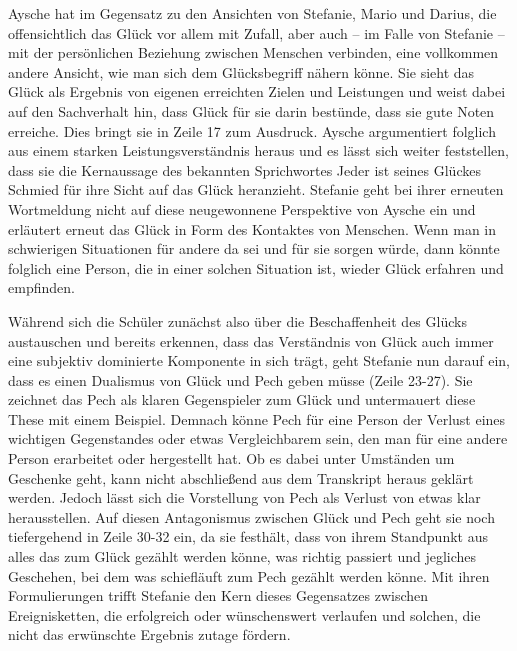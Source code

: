 Aysche hat im Gegensatz zu den Ansichten von Stefanie, Mario und Darius, die offensichtlich das Glück vor allem mit Zufall, aber auch -- im Falle von Stefanie -- mit der persönlichen Beziehung zwischen Menschen verbinden, eine vollkommen andere Ansicht, wie man sich dem Glücksbegriff nähern könne. 
Sie sieht das Glück als Ergebnis von eigenen erreichten Zielen und Leistungen und weist dabei auf den Sachverhalt hin, dass Glück für sie darin bestünde, dass sie gute Noten erreiche.
Dies bringt sie in Zeile 17 zum Ausdruck. 
Aysche argumentiert folglich aus einem starken Leistungsverständnis heraus und es lässt sich weiter feststellen, dass sie die Kernaussage des bekannten Sprichwortes \glqq Jeder ist seines Glückes Schmied\grqq{} für ihre Sicht auf das Glück heranzieht. 
Stefanie geht bei ihrer erneuten Wortmeldung nicht auf diese neugewonnene Perspektive von Aysche ein und erläutert erneut das Glück in Form des Kontaktes von Menschen. 
Wenn man in schwierigen Situationen für andere da sei und für sie sorgen würde, dann könnte folglich eine Person, die in einer solchen Situation ist, wieder Glück erfahren und empfinden. 

Während sich die Schüler zunächst also über die Beschaffenheit des Glücks austauschen und bereits erkennen, dass das Verständnis von Glück auch immer eine subjektiv dominierte Komponente in sich trägt, geht Stefanie nun darauf ein, dass es einen Dualismus von Glück und Pech geben müsse (Zeile 23-27).
Sie zeichnet das Pech als klaren Gegenspieler zum Glück und untermauert diese These mit einem Beispiel. 
Demnach könne Pech für eine Person der Verlust eines wichtigen Gegenstandes oder etwas Vergleichbarem sein, den man für eine andere Person erarbeitet oder hergestellt hat. 
Ob es dabei unter Umständen um Geschenke geht, kann nicht abschließend aus dem Transkript heraus geklärt werden. 
Jedoch lässt sich die Vorstellung von Pech als Verlust von etwas klar herausstellen. 
Auf diesen Antagonismus zwischen Glück und Pech geht sie noch tiefergehend in Zeile 30-32 ein, da sie festhält, dass von ihrem Standpunkt aus alles das zum Glück gezählt werden könne, was \glqq richtig passiert\grqq{} und jegliches Geschehen, bei dem \glqq was schiefläuft\grqq{} zum Pech gezählt werden könne.
Mit ihren Formulierungen trifft Stefanie den Kern dieses Gegensatzes zwischen Ereignisketten, die erfolgreich oder wünschenswert verlaufen und solchen, die nicht das erwünschte Ergebnis zutage fördern. 

